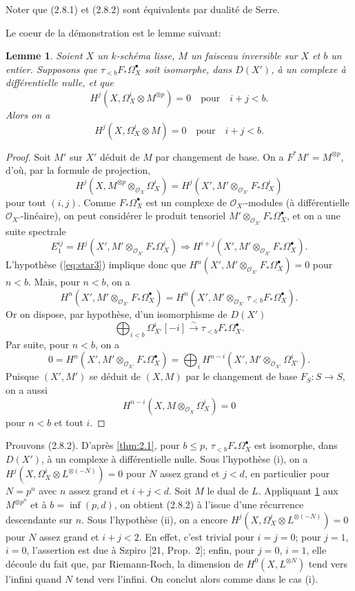 \documentclass[12pt,a4paper]{article}
\theoremstyle{plain}
\newtheorem{lemma}[theorem]{Lemme}
\theoremstyle{definition}
\theoremstyle{remark}
\newcommand{\cO}{\mathcal{O}}
\begin{document}
Noter que (2.8.1) et (2.8.2) sont \'equivalents par dualit\'e de Serre.

Le coeur de la d\'emonstration est le lemme suivant:

\begin{lemma}\label{lem:2.9}
Soient $X$ un $k$-sch\'ema lisse, $M$ un faisceau inversible sur $X$ et $b$ un entier. Supposons que $\tau_{<b} F_* \Omega^{\bullet}_X$ soit isomorphe, dans $D(X')$, \`a un complexe \`a diff\'erentielle nulle, et que
\begin{equation}\label{eq:star3}
H^j(X, \Omega^i_X \otimes M^{\otimes p}) = 0 \quad \text{pour} \quad i + j < b.
\end{equation}
Alors on a
\[
H^j(X, \Omega^i_X \otimes M) = 0 \quad \text{pour} \quad i + j < b.
\]
\end{lemma}

\begin{proof}
Soit $M'$ sur $X'$ d\'eduit de $M$ par changement de base. On a $F^* M' = M^{\otimes p}$, d'o\`u, par la formule de projection,
\[
H^j(X, M^{\otimes p} \otimes_{\cO_X} \Omega^i_X) = H^j(X', M' \otimes_{\cO_{X'}} F_* \Omega^i_X)
\]
pour tout $(i, j)$. Comme $F_* \Omega^{\bullet}_X$ est un complexe de $\cO_{X'}$-modules (\`a diff\'erentielle $\cO_{X'}$-lin\'eaire), on peut consid\'erer le produit tensoriel $M' \otimes_{\cO_{X'}} F_* \Omega^{\bullet}_X$, et on a une suite spectrale
\[
E_1^{ij} = H^j(X', M' \otimes_{\cO_{X'}} F_* \Omega^i_X) \Rightarrow H^{i+j}(X', M' \otimes_{\cO_{X'}} F_* \Omega^{\bullet}_X).
\]
L'hypoth\`ese (\ref{eq:star3}) implique donc que $H^n(X', M' \otimes_{\cO_{X'}} F_* \Omega^{\bullet}_X) = 0$ pour $n < b$. Mais, pour $n < b$, on a
\[
H^n(X', M' \otimes_{\cO_{X'}} F_* \Omega^{\bullet}_X) = H^n(X', M' \otimes_{\cO_{X'}} \tau_{<b} F_* \Omega^{\bullet}_X).
\]
Or on dispose, par hypoth\`ese, d'un isomorphisme de $D(X')$
\[
\bigoplus_{i < b} \Omega^i_{X'}[-i] \xrightarrow{\sim} \tau_{<b} F_* \Omega^{\bullet}_X.
\]
Par suite, pour $n < b$, on a
\[
0 = H^n(X', M' \otimes_{\cO_{X'}} F_* \Omega^{\bullet}_X) = \bigoplus_i H^{n-i}(X', M' \otimes_{\cO_{X'}} \Omega^i_{X'}).
\]
Puisque $(X', M')$ se d\'eduit de $(X, M)$ par le changement de base $F_S: S \to S$, on a aussi
\[
H^{n-i}(X, M \otimes_{\cO_X} \Omega^i_X) = 0
\]
pour $n < b$ et tout $i$.
\end{proof}

Prouvons (2.8.2). D'apr\`es \ref{thm:2.1}, pour $b \le p$, $\tau_{<b} F_* \Omega^{\bullet}_X$ est isomorphe, dans $D(X')$, \`a un complexe \`a diff\'erentielle nulle. Sous l'hypoth\`ese (i), on a $H^j(X, \Omega^i_X \otimes L^{\otimes(-N)}) = 0$ pour $N$ assez grand et $j < d$, en particulier pour $N = p^n$ avec $n$ assez grand et $i + j < d$. Soit $M$ le dual de $L$. Appliquant \ref{lem:2.9} aux $M^{\otimes p^n}$ et \`a $b = \inf(p, d)$, on obtient (2.8.2) \`a l'issue d'une r\'ecurrence descendante sur $n$. Sous l'hypoth\`ese (ii), on a encore $H^j(X, \Omega^i_X \otimes L^{\otimes(-N)}) = 0$ pour $N$ assez grand et $i + j < 2$. En effet, c'est trivial pour $i = j = 0$; pour $j = 1$, $i = 0$, l'assertion est due \`a Szpiro [21, Prop.~2]; enfin, pour $j = 0$, $i = 1$, elle d\'ecoule du fait que, par Riemann-Roch, la dimension de $H^0(X, L^{\otimes N})$ tend vers l'infini quand $N$ tend vers l'infini. On conclut alors comme dans le cas (i).
\end{document}
